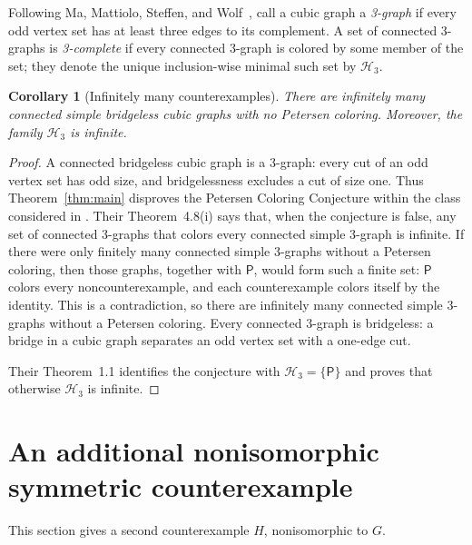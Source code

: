 \documentclass[11pt]{article}
\newtheorem{corollary}[theorem]{Corollary}
\newcommand{\Petersen}{\mathsf P}
\begin{document}
Following Ma, Mattiolo, Steffen, and Wolf~\cite{MaEtAl2025}, call a cubic
graph a \emph{3-graph} if every odd vertex set has at least three edges to its
complement.  A set of connected 3-graphs is \emph{3-complete} if every
connected 3-graph is colored by some member of the set; they denote the unique
inclusion-wise minimal such set by \(\mathcal H_3\).

\begin{corollary}[Infinitely many counterexamples]\label{cor:infinitely-many}
There are infinitely many connected simple bridgeless cubic graphs with no
Petersen coloring.  Moreover, the family \(\mathcal H_3\) is infinite.
\end{corollary}

\begin{proof}
A connected bridgeless cubic graph is a 3-graph: every cut of an odd vertex
set has odd size, and bridgelessness excludes a cut of size one.  Thus
Theorem~\ref{thm:main} disproves the Petersen Coloring Conjecture within the
class considered in \cite{MaEtAl2025}.  Their Theorem~4.8(i) says that, when
the conjecture is false, any set of connected 3-graphs that colors every
connected simple 3-graph is infinite.  If there were only finitely many
connected simple 3-graphs without a Petersen coloring, then those graphs,
together with \(\Petersen\), would form such a finite set: \(\Petersen\) colors
every noncounterexample, and each counterexample colors itself by the identity.
This is a contradiction, so there are infinitely many connected simple
3-graphs without a Petersen coloring.  Every connected 3-graph is bridgeless:
a bridge in a cubic graph separates an odd vertex set with a one-edge cut.

Their Theorem~1.1 identifies the conjecture with
\(\mathcal H_3=\{\Petersen\}\) and proves that otherwise \(\mathcal H_3\) is
infinite.
\end{proof}

\section{An additional nonisomorphic symmetric counterexample}\label{sec:d3}

This section gives a second counterexample \(H\), nonisomorphic to \(G\).
\end{document}
